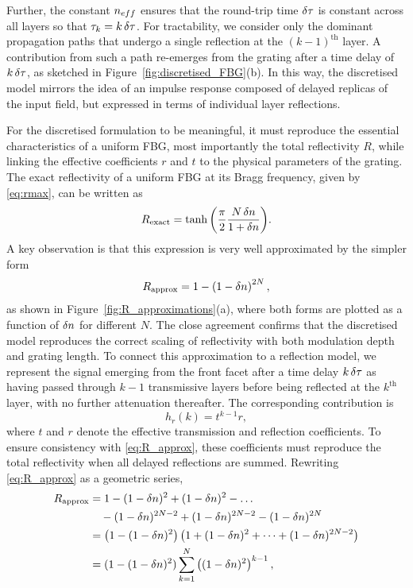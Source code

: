 Further, the constant $n_{eff}$ ensures that the round-trip time $\delta \tau$ is constant across all layers so that $\tau_k = k \, \delta \tau$.
For tractability, we consider only the dominant propagation paths that undergo a single reflection at the $(k-1)^\text{th}$ layer.
A contribution from such a path re-emerges from the grating after a time delay of $k\,\delta \tau$, as sketched in Figure~\ref{fig:discretised_FBG}(b).
In this way, the discretised model mirrors the idea of an impulse response composed of delayed replicas of the input field, but expressed in terms of individual layer reflections.
%
\par
%
For the discretised formulation to be meaningful, it must reproduce the essential characteristics of a uniform FBG, most importantly the total reflectivity $R$, while linking the effective coefficients $r$ and $t$ to the physical parameters of the grating.
The exact reflectivity of a uniform FBG at its Bragg frequency, given by \eqref{eq:rmax}, can be written as
%
\begin{equation}
\label{eq:R_exact}
R_\text{exact} = \tanh{\left(\frac{\pi}{2}\frac{N \, \delta n}{1+\delta n} \right)}.
\end{equation}
%
A key observation is that this expression is very well approximated by the simpler form
%
\begin{equation}
\label{eq:R_approx}
R_\text{approx} = 1 - \left(1 - \delta n \right)^{2N},
\end{equation}
%
as shown in Figure~\ref{fig:R_approximations}(a), where both forms are plotted as a function of $\delta n$ for different $N$.
The close agreement confirms that the discretised model reproduces the correct scaling of reflectivity with both modulation depth and grating length.
To connect this approximation to a reflection model, we represent the signal emerging from the front facet after a time delay $k \, \delta \tau$ as having passed through $k-1$ transmissive layers before being reflected at the $k^\text{th}$ layer, with no further attenuation thereafter.
The corresponding contribution is
%
\begin{equation}
\label{eq:hr1}
h_r(k) = t^{k-1} r,
\end{equation}
%
where $t$ and $r$ denote the effective transmission and reflection coefficients.
To ensure consistency with \eqref{eq:R_approx}, these coefficients must reproduce the total reflectivity when all delayed reflections are summed.
Rewriting \eqref{eq:R_approx} as a geometric series,
%
\begin{align*}
R_\text{approx} &= 1 - (1-\delta n)^2 + (1-\delta n)^2 - \dots \\
&\hspace{1em} - (1-\delta n)^{2N-2} + (1-\delta n)^{2N-2} - (1-\delta n)^{2N} \\
&= \left( 1-(1-\delta n)^2 \right)\left( 1 + (1-\delta n)^2 + \dots + (1-\delta n)^{2N-2} \right) \\
&= (1-(1-\delta n)^2)\sum_{k=1}^{N} \left((1-\delta n)^2\right)^{k-1},
\end{align*}
